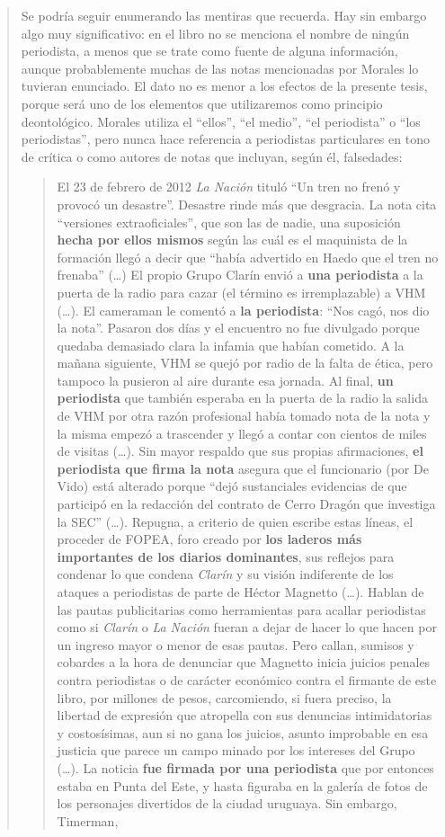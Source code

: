 \begin{quote}
Se podría seguir enumerando las mentiras que recuerda. Hay sin embargo algo muy significativo: en el libro no se menciona el nombre de ningún periodista, a menos que se trate como fuente de alguna información, aunque probablemente muchas de las notas mencionadas por Morales lo tuvieran enunciado. El dato no es menor a los efectos de la presente tesis, porque será uno de los elementos que utilizaremos como principio deontológico. Morales utiliza el \enquote{ellos}, \enquote{el medio}, \enquote{el periodista} o \enquote{los periodistas}, pero nunca hace referencia a periodistas particulares en tono de crítica o como autores de notas que incluyan, según él, falsedades:

\begin{quote}
	El 23 de febrero de 2012 \emph{La Nación} tituló \enquote{Un tren no frenó y provocó un desastre''. Desastre rinde más que desgracia. La nota cita ``versiones extraoficiales}, que son las de nadie, una suposición \textbf{hecha por ellos mismos} según las cuál es el maquinista de la formación llegó a decir que \enquote{había advertido en Haedo que el tren no frenaba} (\dots) El propio Grupo Clarín envió a \textbf{una periodista} a la puerta de la radio para cazar (el término es irremplazable) a VHM (\dots). El cameraman le comentó a \textbf{la periodista}: \enquote{Nos cagó, nos dio la nota}. Pasaron dos días y el encuentro no fue divulgado porque quedaba demasiado clara la infamia que habían cometido. A la mañana siguiente, VHM se quejó por radio de la falta de ética, pero tampoco la pusieron al aire durante esa jornada. Al final, \textbf{un periodista} que también esperaba en la puerta de la radio la salida de VHM por otra razón profesional había tomado nota de la nota y la misma empezó a trascender y llegó a contar con cientos de miles de visitas (\dots). Sin mayor respaldo que sus propias afirmaciones, \textbf{el periodista que firma la nota} asegura que el funcionario (por De Vido) está alterado porque \enquote{dejó sustanciales evidencias de que participó en la redacción del contrato de Cerro Dragón que investiga la SEC} (\dots). Repugna, a criterio de quien escribe estas líneas, el proceder de FOPEA, foro creado por \textbf{los laderos más importantes de los diarios dominantes}, sus reflejos para condenar lo que condena \emph{Clarín} y su visión indiferente de los ataques a periodistas de parte de Héctor Magnetto (\dots). Hablan de las pautas publicitarias como herramientas para acallar periodistas como si \emph{Clarín} o \emph{La Nación }fueran a dejar de hacer lo que hacen por un ingreso mayor o menor de esas pautas. Pero callan, sumisos y cobardes a la hora de denunciar que Magnetto inicia juicios penales contra periodistas o de carácter económico contra el firmante de este libro, por millones de pesos, carcomiendo, si fuera preciso, la libertad de expresión que atropella con sus denuncias intimidatorias y costosísimas, aun si no gana los juicios, asunto improbable en esa justicia que parece un campo minado por los intereses del Grupo (\dots). La noticia \textbf{fue firmada por una periodista} que por entonces estaba en Punta del Este, y hasta figuraba en la galería de fotos de los personajes divertidos de la ciudad uruguaya. Sin embargo, Timerman, 
\end{quote}
\end{quote}

